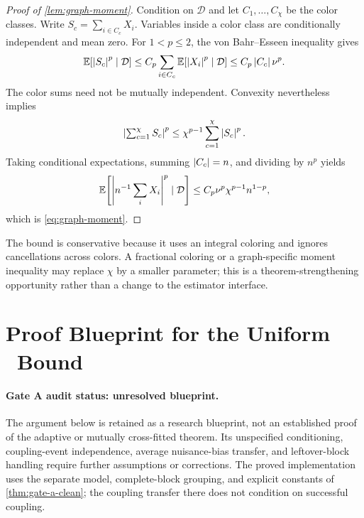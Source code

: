 \begin{proof}[Proof of \cref{lem:graph-moment}]
Condition on $\mathcal D$ and let $C_1,\ldots,C_\chi$ be the color classes. Write $S_c=\sum_{i\in C_c}X_i$. Variables inside a color class are conditionally independent and mean zero. For $1<p\le2$, the von Bahr--Esseen inequality gives
\begin{equation}
    \mathbb{E}[\left|S_c\right|^p\mid\mathcal D]
    \le C_p\sum_{i\in C_c}\mathbb{E}[\left|X_i\right|^p\mid\mathcal D]
    \le C_p\left|C_c\right|\nu^p.
\end{equation}
The color sums need not be mutually independent. Convexity nevertheless implies
\begin{equation}
\left|\textstyle\sum_{c=1}^\chi S_c\right|^p
\le\chi^{p-1}\sum_{c=1}^\chi\left|S_c\right|^p.
\end{equation}
Taking conditional expectations, summing $\left|C_c\right|=n$, and dividing by $n^p$ yields
\begin{equation}
\mathbb{E}\!\left[\left|n^{-1}\sum_iX_i\right|^p\mid\mathcal D\right]
\le C_p\nu^p\chi^{p-1}n^{1-p},
\end{equation}
which is \cref{eq:graph-moment}.
\end{proof}

The bound is conservative because it uses an integral coloring and ignores cancellations across colors. A fractional coloring or a graph-specific moment inequality may replace $\chi$ by a smaller parameter; this is a theorem-strengthening opportunity rather than a change to the estimator interface.

\section{Proof Blueprint for the Uniform \COMET\ Bound}
\label{app:proof-main}

\paragraph{Gate A audit status: unresolved blueprint.}
The argument below is retained as a research blueprint, not an established proof
of the adaptive or mutually cross-fitted theorem. Its unspecified conditioning,
coupling-event independence, average nuisance-bias transfer, and leftover-block
handling require further assumptions or corrections. The proved implementation
uses the separate model, complete-block grouping, and explicit constants of
\cref{thm:gate-a-clean}; the coupling transfer there does not condition on
successful coupling.

